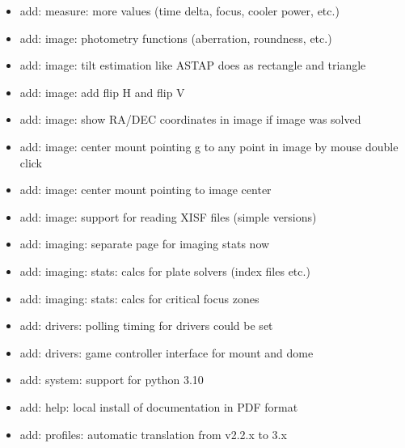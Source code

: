 \documentclass[a4paper,10pt,english]{sphinxmanual}
\begin{document}
\begin{itemize}
\item {} 
\sphinxAtStartPar
add: measure: more values (time delta, focus, cooler power, etc.)

\item {} 
\sphinxAtStartPar
add: image: photometry functions (aberration, roundness, etc.)

\item {} 
\sphinxAtStartPar
add: image: tilt estimation like ASTAP does as rectangle and triangle

\item {} 
\sphinxAtStartPar
add: image: add flip H and flip V

\item {} 
\sphinxAtStartPar
add: image: show RA/DEC coordinates in image if image was solved

\item {} 
\sphinxAtStartPar
add: image: center mount pointing g to any point in image by mouse double click

\item {} 
\sphinxAtStartPar
add: image: center mount pointing to image center

\item {} 
\sphinxAtStartPar
add: image: support for reading XISF files (simple versions)

\item {} 
\sphinxAtStartPar
add: imaging: separate page for imaging stats now

\item {} 
\sphinxAtStartPar
add: imaging: stats: calcs for plate solvers (index files etc.)

\item {} 
\sphinxAtStartPar
add: imaging: stats: calcs for critical focus zones

\item {} 
\sphinxAtStartPar
add: drivers: polling timing for drivers could be set

\item {} 
\sphinxAtStartPar
add: drivers: game controller interface for mount and dome

\item {} 
\sphinxAtStartPar
add: system: support for python 3.10

\item {} 
\sphinxAtStartPar
add: help: local install of documentation in PDF format

\item {} 
\sphinxAtStartPar
add: profiles: automatic translation from v2.2.x to 3.x


\end{itemize}
\end{document}
